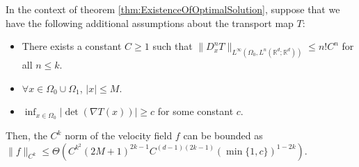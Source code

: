\begin{theorem}\label{thm:fNormGeneral}
In the context of theorem \ref{thm:ExistenceOfOptimalSolution}, suppose that we have the following additional assumptions about the transport map $T$:
\begin{itemize}
    \item There exists a constant $C \geq 1$ such that $\|D^n_xT\|_{L^\infty(\Omega_0,L^n(\mathbb{R}^d;\mathbb{R}^d))} \leq n!C^{n}$ for all $n \leq k$. 
    \item $\forall x\in\Omega_0\cup\Omega_1$, $|x| \leq M$.
    \item $\inf_{x\in\Omega_0} |\det(\nabla T(x))| \geq c$ for some constant $c$. 
    

    
    
\end{itemize}
Then, the $C^k$ norm of the velocity field $f$ can be bounded as $\|f\|_{C^k} \leq \Theta(C^{k^2}(2M+1)^{2k-1}C^{(d-1)(2k-1)}(\min\{1, c\})^{1-2k})$. 
\end{theorem}
